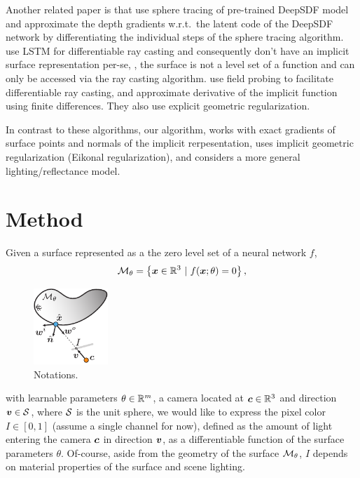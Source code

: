 \documentclass[runningheads]{llncs}
\begin{document}
Another related paper is \cite{liu2019dist} that use sphere tracing of pre-trained DeepSDF model \cite{park2019deepsdf} and approximate the depth gradients w.r.t.~the latent code of the DeepSDF network by differentiating the individual steps of the sphere tracing algorithm. 
%
\cite{sitzmann2019scene} use LSTM for differentiable ray casting and consequently don't have an implicit surface representation per-se, \ie, the surface is not a level set of a function and can only be accessed via the ray casting algorithm.
%
\cite{liu2019learning} use field probing to facilitate differentiable ray casting, and approximate derivative of the implicit function using finite differences. They also use explicit geometric regularization.

In contrast to these algorithms, our algorithm, works with exact gradients of surface points and normals of the implicit rerpesentation, uses implicit geometric regularization (Eikonal regularization), and considers a more general lighting/reflectance model. \vspace{-10pt}



\section{Method}\vspace{-5pt}
Given a surface represented as a the zero level set of a neural network $f$,
\begin{equation}\label{e:gM}
 {\mathcal{M}}_\theta=\left\{{\bm{x}}\in\mathbb R^3 \ \vert \ f({\bm{x}};\theta)=0\right\},
\end{equation}
%
\begin{figure}
  \begin{center}\vspace{-40pt}
    \includegraphics[width=0.25\textwidth]{notation.pdf}
  \end{center}\vspace{-20pt}
  \caption{Notations.}\label{fig:notation}
\end{figure}
%
with learnable parameters $\theta\in\mathbb R^m$, a camera located at ${\bm{c}}\in\mathbb R^3$ and direction ${\bm{v}}\in{\mathcal{S}}$, where ${\mathcal{S}}$ is the unit sphere, we would like to express the pixel color $I\in[0,1]$ (assume a single channel for now),  defined as the amount of light entering the camera ${\bm{c}}$ in direction ${\bm{v}}$, as a differentiable function of the surface parameters $\theta$. 
%
Of-course, aside from the geometry of the surface ${\mathcal{M}}_\theta$, $I$ depends on material properties of the surface and scene lighting. 
\end{document}
